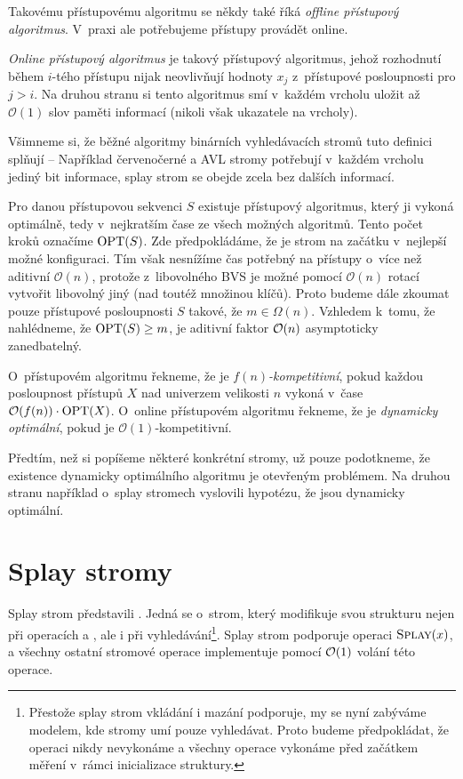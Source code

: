 Takovému přístupovému algoritmu se někdy také říká \emph{offline přístupový
algoritmus}. V~praxi ale potřebujeme přístupy provádět online.

\begin{definice}
\emph{Online přístupový algoritmus} je takový přístupový algoritmus, jehož
rozhodnutí během $i$-tého přístupu nijak neovlivňují hodnoty $x_j$ z~přístupové
posloupnosti pro $j>i$. Na druhou stranu si tento algoritmus smí v~každém
vrcholu uložit až $\mathcal O(1)$ slov paměti informací (nikoli však ukazatele
na vrcholy).
\end{definice}

Všimneme si, že běžné algoritmy binárních vyhledávacích stromů tuto definici
splňují -- Například červenočerné a AVL stromy potřebují v~každém vrcholu
jediný bit informace, splay strom se obejde zcela bez dalších informací.

Pro danou přístupovou sekvenci $S$ existuje přístupový algoritmus, který ji
vykoná optimálně, tedy v~nejkratším čase ze všech možných algoritmů. Tento
počet kroků označíme $\operatorname{OPT}(S)$. Zde předpokládáme, že je strom na začátku
v~nejlepší možné konfiguraci. Tím však nesnížíme čas potřebný na přístupy o~více
než aditivní $\mathcal O(n)$, protože z~libovolného BVS je možné pomocí
$\mathcal O(n)$ rotací vytvořit libovolný jiný (nad toutéž množinou klíčů).
Proto budeme dále zkoumat pouze přístupové posloupnosti $S$ takové, že $m \in
\Omega(n)$. Vzhledem k~tomu, že nahlédneme, že $\operatorname{OPT}(S)\geq m$, je aditivní
faktor $\mathcal O(n)$ asymptoticky zanedbatelný. 


\begin{definice}
O~přístupovém algoritmu řekneme, že je \emph{$f(n)$-kompetitivní}, pokud každou
posloupnost přístupů $X$ nad univerzem velikosti $n$ vykoná v~čase $
\mathcal O(f(n))\cdot\operatorname{OPT}(X)$. O~online přístupovém algoritmu řekneme, že je
\emph{dynamicky optimální}, pokud je $\mathcal O(1)$-kompetitivní.
\end{definice}

Předtím, než si popíšeme některé konkrétní stromy, už pouze podotkneme, že
existence dynamicky optimálního algoritmu je otevřeným problémem. Na druhou
stranu například o~splay stromech vyslovili \citet{splay} hypotézu, že jsou
dynamicky optimální.

\section{Splay stromy}

Splay strom představili \citet{splay}. Jedná se o~strom, který modifikuje svou
strukturu nejen při operacích  a , ale i při
vyhledávání\footnote{Přestože splay strom vkládání i mazání podporuje, my se
nyní zabýváme modelem, kde stromy umí pouze vyhledávat. Proto budeme
předpokládat, že operaci  nikdy nevykonáme a všechny operace
 vykonáme před začátkem měření v~rámci inicializace struktury.}.
Splay strom podporuje operaci $\ope{Splay}(x)$, a všechny ostatní stromové
operace implementuje pomocí $\mathcal O(1)$ volání této operace.

